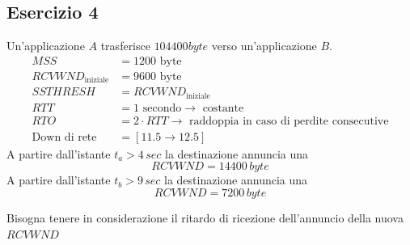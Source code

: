 \documentclass[a4paper]{article}
\begin{document}
\subsection{Esercizio 4}
Un'applicazione \( A \) trasferisce \( 104400byte \) verso un'applicazione \( B \).
\[
\begin{aligned}
  MSS &= 1200 \text{ byte}\\
  RCVWND_{\text{iniziale}} &= 9600 \text{ byte}\\
  SSTHRESH &= RCVWND_{\text{iniziale}}\\
  RTT &= 1 \text{ secondo} \to \text{ costante}\\
  RTO &= 2 \cdot RTT \to \text{ raddoppia in caso di perdite consecutive}\\
  \text{Down di rete} &= [11.5 \to 12.5]
\end{aligned}
\]
A partire dall'istante \( t_a > 4\,sec \) la destinazione annuncia una
\[
  RCVWND = 14400\,byte
\]
A partire dall'istante \( t_b > 9\,sec \) la destinazione annuncia una
\[
  RCVWND = 7200\,byte
\]

\vspace{1em}
\noindent
Bisogna tenere in considerazione il ritardo di ricezione dell'annuncio della nuova
\( RCVWND \) 
\end{document}
